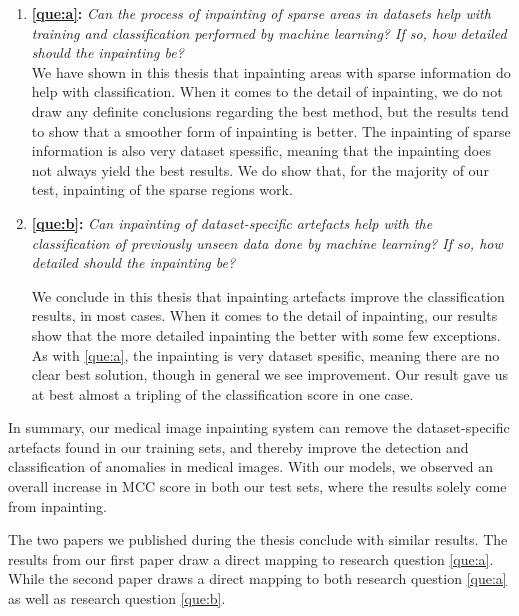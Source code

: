\begin{enumerate}

\item \textbf{\ref{que:a}:} \textit{ Can the process of inpainting of sparse areas in datasets help with training and classification performed by machine learning? If so, how detailed should the inpainting be?}\\ 
    
We have shown in this thesis that inpainting areas with sparse information do help with classification. 
When it comes to the detail of inpainting, we do not draw any definite conclusions regarding the best method, but the results tend to show that a smoother form of inpainting is better.
The inpainting of sparse information is also very dataset spessific, meaning that the inpainting does not always yield the best results.
We do show that, for the majority of our test, inpainting of the sparse regions work.


\item \textbf{\ref{que:b}:} \textit{ Can inpainting of dataset-specific artefacts help with the classification of previously unseen data done by machine learning? If so, how detailed should the inpainting be?}
    
We conclude in this thesis that inpainting artefacts improve the classification results, in most cases. 
When it comes to the detail of inpainting, our results show that the more detailed inpainting the better with some few exceptions. 
As with \ref{que:a}, the inpainting is very dataset spesific, meaning there are no clear best solution, though in general we see improvement.
Our result gave us at best almost a tripling of the classification score in one case.

\end{enumerate}


\noindent
In summary, our medical image inpainting system can remove the dataset-specific artefacts found in our training sets, and thereby improve the detection and classification of anomalies in medical images.
With our models, we observed an overall increase in MCC score in both our test sets, where the results solely come from inpainting.

The two papers we published during the thesis conclude with similar results. The results from our first paper draw a direct mapping to research question \ref{que:a}. While the second paper draws a direct mapping to both research question \ref{que:a} as well as research question \ref{que:b}. 



